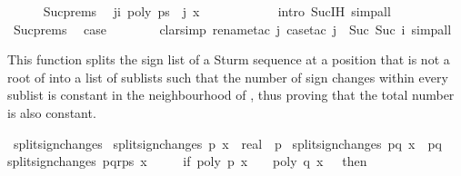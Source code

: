 \begin{isabellebody}
\ \ \ \ \isamarkupfalse%
\ Suc{\isachardot}prems\ \isamarkupfalse%
\ {\isachardoublequoteopen}{\isasymforall}j{\isasymle}i{\isacharplus}{}{\isachardot}\ poly\ {\isacharparenleft}ps\ {\isacharbang}\ j{\isacharparenright}\ x\ {\isacharequal}\ {}{\isachardoublequoteclose}\isanewline
\ \ \ \ \ \ \ \ \isamarkupfalse%
\ {\isacharparenleft}intro\ Suc{\isachardot}IH{\isacharcomma}\ simp{\isacharunderscore}all{\isacharparenright}\isanewline
\ \ \ \ \isamarkupfalse%
\ Suc{\isachardot}prems{\isacharparenleft}{}{\isacharparenright}\ \isamarkupfalse%
\ {\isacharquery}case\isanewline
\ \ \ \ \ \ \isamarkupfalse%
\ {\isacharparenleft}clarsimp{\isacharcomma}\ rename{\isacharunderscore}tac\ j{\isacharcomma}\ case{\isacharunderscore}tac\ {\isachardoublequoteopen}j\ {\isacharequal}\ Suc\ {\isacharparenleft}Suc\ i{\isacharparenright}{\isachardoublequoteclose}{\isacharcomma}\ simp{\isacharunderscore}all{\isacharparenright}\isanewline
{}\isamarkupfalse%
%
\endisatagproof
{\isafoldproof}%
%
\isadelimproof
%
\endisadelimproof
%
\begin{isamarkuptext}%
This function splits the sign list of a Sturm sequence at a 
  position  that is not a root of  into a 
  list of sublists such that the number of sign changes within 
  every sublist is constant in the neighbourhood of ,
  thus proving that the total number is also constant.%
\end{isamarkuptext}%
\isamarkuptrue%
\isamarkupfalse%
\ split{\isacharunderscore}sign{\isacharunderscore}changes\ \isanewline
{\isachardoublequoteopen}split{\isacharunderscore}sign{\isacharunderscore}changes\ {\isacharbrackleft}p{\isacharbrackright}\ {\isacharparenleft}x\ {\isacharcolon}{\isacharcolon}\ real{\isacharparenright}\ {\isacharequal}\ {\isacharbrackleft}{\isacharbrackleft}p{\isacharbrackright}{\isacharbrackright}{\isachardoublequoteclose}\ {\isacharbar}\isanewline
{\isachardoublequoteopen}split{\isacharunderscore}sign{\isacharunderscore}changes\ {\isacharbrackleft}p{\isacharcomma}q{\isacharbrackright}\ x\ {\isacharequal}\ {\isacharbrackleft}{\isacharbrackleft}p{\isacharcomma}q{\isacharbrackright}{\isacharbrackright}{\isachardoublequoteclose}\ {\isacharbar}\isanewline
{\isachardoublequoteopen}split{\isacharunderscore}sign{\isacharunderscore}changes\ {\isacharparenleft}p{\isacharhash}q{\isacharhash}r{\isacharhash}ps{\isacharparenright}\ x\ {\isacharequal}\isanewline
\ \ \ \ {\isacharparenleft}if\ poly\ p\ x\ {\isasymnoteq}\ {}\ {\isasymand}\ poly\ q\ x\ {\isacharequal}\ {}\ then\ \isanewline

\end{isabellebody}
